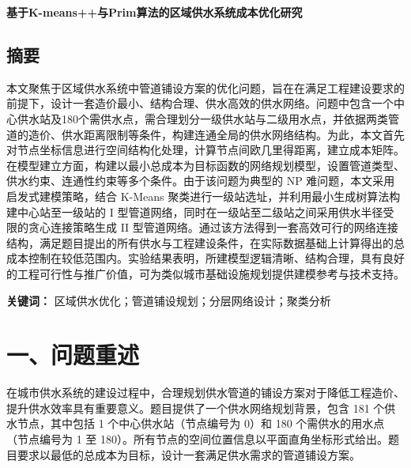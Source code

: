 \documentclass[12pt,a4paper]{article}
\begin{document}
\begin{center}
  \vspace*{1em} %
  {\LARGE \bfseries 基于K-means++与Prim算法的区域供水系统成本优化研究 \par}
  \vspace{0.5em} %
\end{center}

\begin{center}
\begin{minipage}{0.95\textwidth} %
\normalsize %
\setlength{\parindent}{2em} %
\section*{\centering 摘要}
本文聚焦于区域供水系统中管道铺设方案的优化问题，旨在在满足工程建设要求的前提下，设计一套造价最小、结构合理、供水高效的供水网络。问题中包含一个中心供水站及180个需供水点，需合理划分一级供水站与二级用水点，并依据两类管道的造价、供水距离限制等条件，构建连通全局的供水网络结构。为此，本文首先对节点坐标信息进行空间结构化处理，计算节点间欧几里得距离，建立成本矩阵。在模型建立方面，构建以最小总成本为目标函数的网络规划模型，设置管道类型、供水约束、连通性约束等多个条件。由于该问题为典型的 NP 难问题，本文采用启发式建模策略，结合 K-Means 聚类进行一级站选址，并利用最小生成树算法构建中心站至一级站的 I 型管道网络，同时在一级站至二级站之间采用供水半径受限的贪心连接策略生成 II 型管道网络。通过该方法得到一套高效可行的网络连接结构，满足题目提出的所有供水与工程建设条件，在实际数据基础上计算得出的总成本控制在较低范围内。实验结果表明，所建模型逻辑清晰、结构合理，具有良好的工程可行性与推广价值，可为类似城市基础设施规划提供建模参考与技术支持。

\textbf{关键词：} 区域供水优化；管道铺设规划；分层网络设计；聚类分析
\end{minipage}
\end{center}
\vspace{1em} %

\section*{\centering 一、问题重述}
在城市供水系统的建设过程中，合理规划供水管道的铺设方案对于降低工程造价、提升供水效率具有重要意义。题目提供了一个供水网络规划背景，包含 181 个供水节点，其中包括 1 个中心供水站（节点编号为 0）和 180 个需供水的用水点（节点编号为 1 至 180）。所有节点的空间位置信息以平面直角坐标形式给出。题目要求以最低的总成本为目标，设计一套满足供水需求的管道铺设方案。
\end{document}

